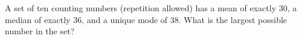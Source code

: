 A set of ten counting numbers (repetition allowed) has a mean of exactly $30$, a median of exactly $36$, and a unique mode of $38$. What is the largest possible number in the set?
